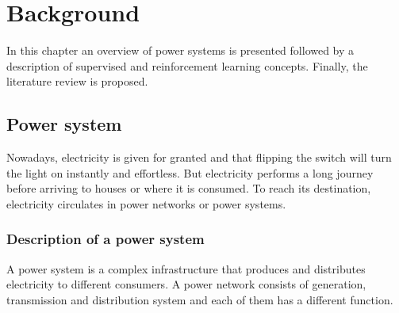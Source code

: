 \chapter{Background}
\label{ch2}
In this chapter an overview of power systems is presented followed by a description of supervised and reinforcement learning concepts. Finally, the literature review is proposed.

\section{Power system}
\label{sec:2ps}
Nowadays, electricity is given for granted and that flipping the switch will turn the light on instantly and effortless. But electricity performs a long journey before arriving to houses or where it is consumed. To reach its destination, electricity circulates in power networks or power systems.\\
\subsection{Description of a power system}

A power system is a complex infrastructure that produces and distributes electricity to different consumers. A power network consists of generation, transmission and distribution system and each of them has a different function. \\


